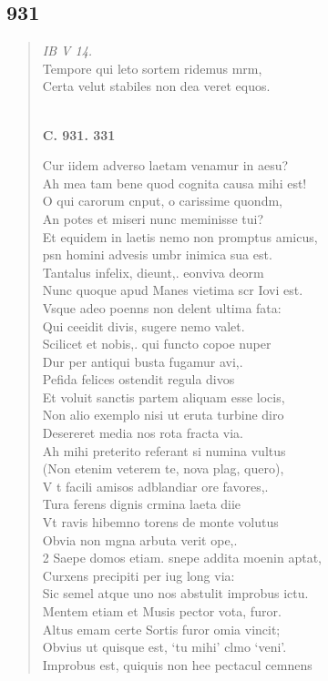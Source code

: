 \documentclass[11pt, a4paper]{report}
\begin{document}
            \subsection*{931}
      \begin{verse}
      \textit{IB V 14.} \\ Tempore qui leto sortem ridemus mrm, \\ Certa velut stabiles non dea veret equos. \\ 
        ﻿\pagebreak 
    \begin{center} \textbf{C. 931. 331} \end{center} \marginpar{[353]} Cur iidem adverso laetam venamur in aesu? \\ Ah mea tam bene quod cognita causa mihi est! \\ O qui carorum cnput, o carissime quondm, \\ An potes et miseri nunc meminisse tui? \\ Et equidem in laetis nemo non promptus amicus, \\ psn homini advesis umbr inimica sua est. \\ Tantalus infelix, dieunt,. eonviva deorm \\ Nunc quoque apud Manes vietima scr Iovi est. \\ Vsque adeo poenns non delent ultima fata: \\ Qui ceeidit divis, sugere nemo valet. \\ Scilicet et nobis,. qui functo copoe nuper \\ Dur per antiqui busta fugamur avi,. \\ Pefida felices ostendit regula divos \\ Et voluit sanctis partem aliquam esse locis, \\ Non alio exemplo nisi ut eruta turbine diro \\ Desereret media nos rota fracta via. \\ Ah mihi preterito referant si numina vultus \\ (Non etenim veterem te, nova plag, quero), \\ V t facili amisos adblandiar ore favores,. \\ Tura ferens dignis crmina laeta diie \\ Vt ravis hibemno torens de monte volutus \\ Obvia non mgna arbuta verit ope,. \\ 2 Saepe domos etiam. snepe addita moenin aptat, \\ Curxens precipiti per iug long via: \\ Sic semel atque uno nos abstulit improbus ictu. \\ Mentem etiam et Musis pector vota, furor. \\ Altus emam certe Sortis furor omia vincit; \\ Obvius ut quisque est, ‘tu mihi’ clmo ‘veni’. \\ Improbus est, quiquis non hee pectacul cemnens \\ 

\end{verse}
\end{document}
